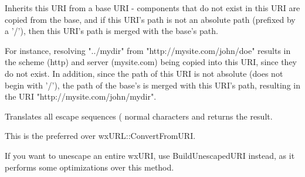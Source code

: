 

\label{wxuriresolve}


Inherits this URI from a base URI - components that do not
exist in this URI are copied from the base, and if this URI's
path is not an absolute path (prefixed by a '/'), then this URI's
path is merged with the base's path.

For instance, resolving "../mydir" from "http://mysite.com/john/doe" 
results in the scheme (http) and server (mysite.com) being copied into 
this URI, since they do not exist.  In addition, since the path
of this URI is not absolute (does not begin with '/'), the path
of the base's is merged with this URI's path, resulting in the URI
"http://mysite.com/john/mydir".


\label{wxuriunescape}


Translates all escape sequences (%
normal characters and returns the result.

This is the preferred over wxURL::ConvertFromURI.

If you want to unescape an entire wxURI, use BuildUnescapedURI instead,
as it performs some optimizations over this method.



